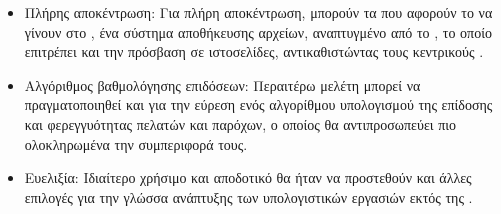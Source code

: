 \begin{itemize}
\item Πλήρης αποκέντρωση: Για πλήρη αποκέντρωση, μπορούν τα  που αφορούν το  να γίνουν  στο , ένα  σύστημα αποθήκευσης αρχείων, αναπτυγμένο από το , το οποίο επιτρέπει και την πρόσβαση σε ιστοσελίδες, αντικαθιστώντας τους κεντρικούς  \cite{ref45}.
\item Αλγόριθμος βαθμολόγησης επιδόσεων: Περαιτέρω μελέτη μπορεί να πραγματοποιηθεί και για την εύρεση ενός αλγορίθμου υπολογισμού της επίδοσης και φερεγγυότητας πελατών και παρόχων, ο οποίος θα αντιπροσωπεύει πιο ολοκληρωμένα την συμπεριφορά τους.
\item Ευελιξία: Ιδιαίτερο χρήσιμο και αποδοτικό θα ήταν να προστεθούν και άλλες επιλογές για την γλώσσα ανάπτυξης των υπολογιστικών εργασιών εκτός της .
\end{itemize}




